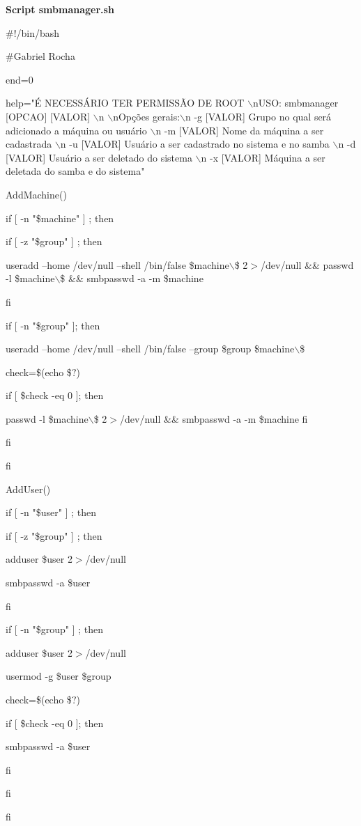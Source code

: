 \textbf{Script smbmanager.sh}

\#!/bin/bash

\#Gabriel Rocha

end=0

help="É NECESSÁRIO TER PERMISSÃO DE ROOT $\backslash$nUSO: smbmanager [OPCAO] [VALOR] $\backslash$n 
$\backslash$nOpções gerais:$\backslash$n -g [VALOR]   Grupo no qual será adicionado a máquina ou usuário  $\backslash$n -m [VALOR]   Nome da máquina a ser cadastrada $\backslash$n -u [VALOR]   Usuário a ser cadastrado no sistema e no samba $\backslash$n -d [VALOR]   Usuário a ser deletado do sistema $\backslash$n -x [VALOR]   Máquina a ser deletada do samba e do sistema"

AddMachine(){

if [ -n "\$machine" ] ; then

    if [ -z "\$group" ] ; then

        useradd --home /dev/null --shell /bin/false \$machine$\backslash$\$ 2$ >$/dev/null \&\& passwd -l \$machine$\backslash$\$ \&\& smbpasswd -a -m \$machine

    fi

    if [ -n "\$group" ]; then
	
        useradd --home /dev/null --shell /bin/false --group \$group \$machine$\backslash$\$ 

	check=\$(echo \$$?$)

		if [ \$check -eq 0 ]; then
	
 			passwd -l \$machine$\backslash$\$ 2$>$/dev/null \&\& smbpasswd -a -m \$machine 
       fi

    fi        

fi

}

AddUser(){

if [ -n "\$user" ] ; then

    if [ -z "\$group" ] ; then

        adduser \$user 2$>$/dev/null 

        smbpasswd -a \$user

    fi

    if [ -n "\$group" ] ; then

        adduser \$user 2$>$/dev/null

        usermod -g \$user \$group

		check=\$(echo \$$?$)

		if [ \$check -eq 0 ]; then

        	smbpasswd -a \$user

		fi
		
    fi

fi

}

